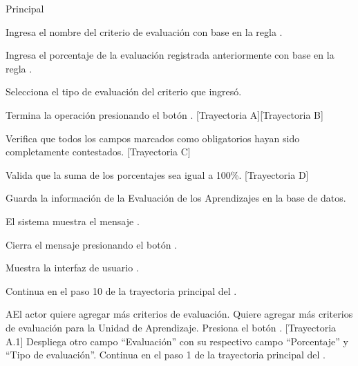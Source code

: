 \begin{UCtrayectoria}{Principal}
    
    \UCpaso[\UCactor] Ingresa el nombre del criterio de evaluación con base en la regla .

    \UCpaso[\UCactor] Ingresa el porcentaje de la evaluación registrada anteriormente con base en la regla .
    
    \UCpaso[\UCactor] Selecciona el tipo de evaluación del criterio que ingresó.
    
    \UCpaso[\UCactor] Termina la operación presionando el botón . [Trayectoria A][Trayectoria B]

    \UCpaso Verifica que todos los campos marcados como obligatorios hayan sido completamente contestados. [Trayectoria C]

    \UCpaso Valida que la suma de los porcentajes sea igual a 100\%. [Trayectoria D]

    \UCpaso Guarda la información de la Evaluación de los Aprendizajes en la base de datos.

    \UCpaso El sistema muestra el mensaje .

    \UCpaso[\UCactor] Cierra el mensaje presionando el botón .

    \UCpaso Muestra la interfaz de usuario .
    
    \UCpaso Continua en el paso 10 de la trayectoria principal del .
    
\end{UCtrayectoria}


\begin{UCtrayectoriaA}{A}{El actor quiere agregar más criterios de evaluación.}
    \UCpaso[\UCactor] Quiere agregar más criterios de evaluación para la Unidad de Aprendizaje.
    \UCpaso[\UCactor] Presiona el botón . [Trayectoria A.1]
    \UCpaso Despliega otro campo ``Evaluación'' con su respectivo campo ``Porcentaje'' y ``Tipo de evaluación''.
    \UCpaso Continua en el paso 1 de la trayectoria principal del .
\end{UCtrayectoriaA}


